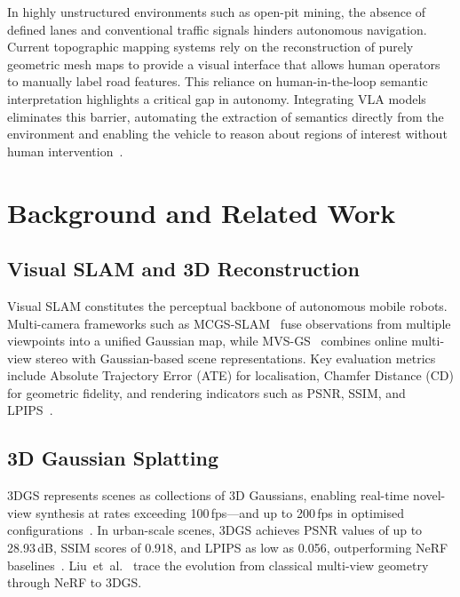 \documentclass[conference]{IEEEtran}
\begin{document}
In highly unstructured environments such as open-pit mining, the absence of defined lanes and conventional traffic signals hinders autonomous navigation. Current topographic mapping systems rely on the reconstruction of purely geometric mesh maps to provide a visual interface that allows human operators to manually label road features. This reliance on human-in-the-loop semantic interpretation highlights a critical gap in autonomy. Integrating VLA models eliminates this barrier, automating the extraction of semantics directly from the environment and enabling the vehicle to reason about regions of interest without human intervention~\cite{wang2022terrain}.

\section{Background and Related Work}
\label{sec:background}

\subsection{Visual SLAM and 3D Reconstruction}
\label{subsec:vislam}

Visual SLAM constitutes the perceptual backbone of autonomous mobile robots.
Multi-camera frameworks such as MCGS-SLAM~\cite{cao2024mcgs} fuse observations from multiple viewpoints into a unified Gaussian map, while MVS-GS~\cite{lee2025mvsgs} combines online multi-view stereo with Gaussian-based scene representations.
Key evaluation metrics include Absolute Trajectory Error (ATE) for localisation, Chamfer Distance (CD) for geometric fidelity, and rendering indicators such as PSNR, SSIM, and LPIPS~\cite{atik2025comparative}.

\subsection{3D Gaussian Splatting}
\label{subsec:3dgs}

3DGS represents scenes as collections of 3D Gaussians, enabling real-time novel-view synthesis at rates exceeding 100\,fps---and up to 200\,fps in optimised configurations~\cite{li2025drivingforward}.
In urban-scale scenes, 3DGS achieves PSNR values of up to 28.93\,dB, SSIM scores of 0.918, and LPIPS as low as 0.056, outperforming NeRF baselines~\cite{atik2025comparative, lu2025horizongs}.
Liu~et~al.~\cite{liu2025survey3dgs} trace the evolution from classical multi-view geometry through NeRF to 3DGS.
\end{document}
